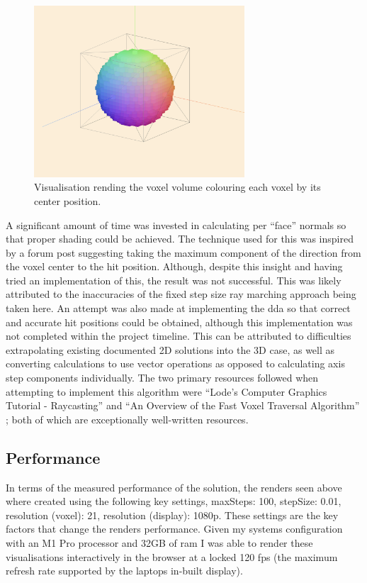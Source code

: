 \documentclass[titlepage]{article}
\begin{document}
\begin{figure}[htp]
  \centering
  \includegraphics[width=0.7\textwidth]{position.png}
  \caption{Visualisation rending the voxel volume colouring each voxel by its center position.}
\end{figure}
\FloatBarrier

A significant amount of time was invested in calculating per ``face'' normals so that proper shading could be achieved. The technique used for this was inspired by a forum post \cite{reddit} suggesting taking the maximum component of the direction from the voxel center to the hit position. Although, despite this insight and having tried an implementation of this, the result was not successful. This was likely attributed to the inaccuracies of the fixed step size ray marching approach being taken here. An attempt was also made at implementing the \gls{dda} so that correct and accurate hit positions could be obtained, although this implementation was not completed within the project timeline. This can be attributed to difficulties extrapolating existing documented 2D solutions into the 3D case, as well as converting calculations to use vector operations as opposed to calculating axis step components individually. The two primary resources followed when attempting to implement this algorithm were ``Lode's Computer Graphics Tutorial - Raycasting'' \cite{dda:article} and ``An Overview of the Fast Voxel Traversal Algorithm'' \cite{dda:github}; both of which are exceptionally well-written resources.

\subsection{Performance}

In terms of the measured performance of the solution, the renders seen above where created using the following key settings, maxSteps: 100, stepSize: 0.01, resolution (voxel): 21, resolution (display): 1080p. These settings are the key factors that change the renders performance. Given my systems configuration with an M1 Pro processor and 32GB of \gls{ram} I was able to render these visualisations interactively in the browser at a locked 120 \gls{fps} (the maximum refresh rate supported by the laptops in-built display).
\end{document}
